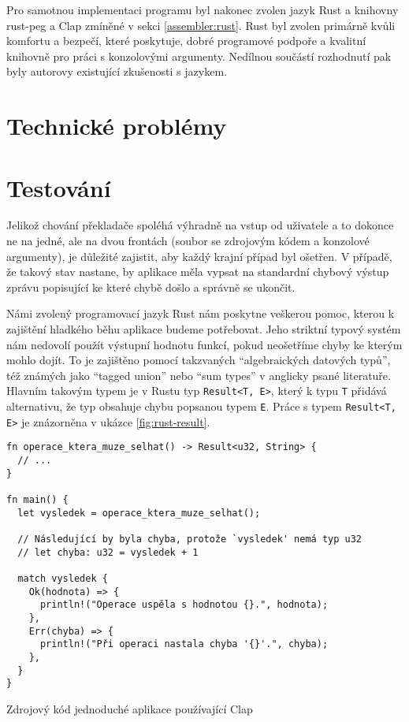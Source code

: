 Pro samotnou implementaci programu byl nakonec zvolen jazyk Rust a knihovny rust-peg a Clap zmíněné v sekci \ref{assembler:rust}. Rust byl zvolen primárně kvůli komfortu a bezpečí, které poskytuje, dobré programové podpoře a kvalitní knihovně pro práci s konzolovými argumenty. Nedílnou součástí rozhodnutí pak byly autorovy existující zkušenosti s jazykem.

\section{Technické problémy}


\blind[3]

\section{Testování}

Jelikož chování překladače spoléhá výhradně na vstup od uživatele a to dokonce ne na jedné, ale na dvou frontách (soubor se zdrojovým kódem a konzolové argumenty), je důležité zajistit, aby každý krajní případ byl ošetřen. V případě, že takový stav nastane, by aplikace měla vypsat na standardní chybový výstup zprávu popisující ke které chybě došlo a správně se ukončit.

Námi zvolený programovací jazyk Rust nám poskytne veškerou pomoc, kterou k zajištění hladkého běhu aplikace budeme potřebovat. Jeho striktní typový systém nám nedovolí použít výstupní hodnotu funkcí, pokud neošetříme chyby ke kterým mohlo dojít. To je zajištěno pomocí takzvaných ``algebraických datových typů'', též známých jako ``tagged union'' nebo ``sum types'' v anglicky psané literatuře. Hlavním takovým typem je v Rustu typ \texttt{Result<T, E>}, který k typu \texttt{T} přidává alternativu, že typ obsahuje chybu popsanou typem \texttt{E}. Práce s typem \texttt{Result<T, E>} je znázorněna v ukázce \ref{fig:rust-result}.

\begin{listing}
\begin{verbatim}
fn operace_ktera_muze_selhat() -> Result<u32, String> {
  // ...
} 

fn main() {
  let vysledek = operace_ktera_muze_selhat();
  
  // Následující by byla chyba, protože `vysledek' nemá typ u32
  // let chyba: u32 = vysledek + 1
  
  match vysledek {
    Ok(hodnota) => {
      println!("Operace uspěla s hodnotou {}.", hodnota);
    },
    Err(chyba) => {
      println!("Při operaci nastala chyba '{}'.", chyba);
    },
  }
}
\end{verbatim}
\caption{Zdrojový kód jednoduché aplikace používající Clap}
\label{fig:rust-result}
\end{listing}


